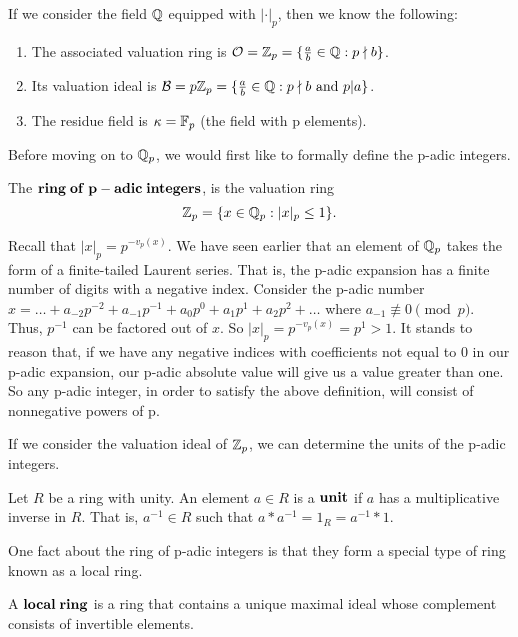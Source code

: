 \documentclass[a4paper]{article}
\begin{document}
If we consider the field $\mathbb Q$ equipped with $|\cdot|_p$, then we know the 
following:
\begin{enumerate}
  \item The associated valuation ring is $\mathcal{O}=\mathbb Z_{p}=
  \{\frac{a}{b}\in\mathbb Q: p\nmid b\}$.
  \item Its valuation ideal is $\mathcal{B}=p\mathbb Z_{p}=
  \{\frac{a}{b}\in\mathbb Q: p\nmid b\text{ and }p|a\}$.
  \item The residue field is $\kappa=\mathbb F_p$ (the field with p 
  elements).
\end{enumerate}

Before moving on to $\mathbb Q_p$, we would first like to formally define the 
p-adic integers.

\begin{definition}
The $\bf{ring\;of\;p-adic\;integers}$, is the valuation ring
\[
	\mathbb Z_p=\{x\in\mathbb Q_p:|x|_p\leq 1\}.
\]
\end{definition}

Recall that $|x|_p=p^{-v_p(x)}$.  We have seen earlier that an element
of $\mathbb Q_p$ takes the form of a finite-tailed Laurent series.  That is,
the p-adic expansion has a finite number of digits with a negative
index.  Consider the p-adic number 
$x=\dots+a_{-2}p^{-2}+a_{-1}p^{-1}+a_0p^0+a_1p^1+a_2p^2+\dots$ where 
$a_{-1}\not\equiv 0\pmod p$.  Thus, $p^{-1}$ can be factored out of $x$.
So $|x|_p=p^{-v_p(x)}=p^{1}>1$.  It stands to reason that, if we have
any negative indices with coefficients not equal to 0 in our p-adic
expansion, our p-adic absolute value will give us a value greater than
one.  So any p-adic integer, in order to satisfy the above definition, 
will consist of nonnegative powers of p.

If we consider the valuation ideal of $\mathbb Z_p$, we can determine the
units of the p-adic integers.

\begin{definition}[Unit]
Let $R$ be a ring with unity.  An element $a\in R$ is a $\bf{unit}$ if 
$a$ has a multiplicative inverse in $R$.  That is, $a^{-1}\in R$ such 
that $a*a^{-1}=1_R=a^{-1}*1$.
\end{definition}

One fact about the ring of p-adic integers is that they form a special
type of ring known as a local ring.

\begin{definition}
A $\bf{local\;ring}$ is a ring that contains a unique maximal ideal
whose complement consists of invertible elements.
\end{definition}
\end{document}
